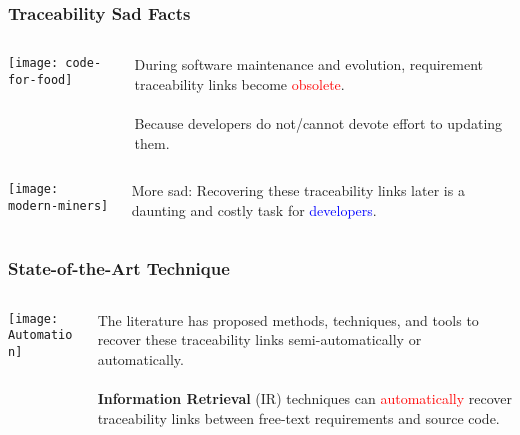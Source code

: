 \documentclass[12pt,hyperref=true,mathserif]{beamer}
\begin{document}
\begin{frame}
\frametitle{Traceability Sad Facts}
\begin{columns}
\begin{column}{0.5\textwidth}
\texttt{[image: code-for-food]}
\end{column}
\begin{column}{0.5\textwidth}
During software maintenance and evolution, requirement traceability links become \textcolor{red}{obsolete}.\\
~\\
Because developers do not/cannot devote effort to updating them.
\end{column}
\end{columns}
\end{frame}

\begin{frame}
\begin{columns}
\begin{column}{0.5\textwidth}
\texttt{[image: modern-miners]}
\end{column}
\begin{column}{0.5\textwidth}
More sad: Recovering these traceability links later is a daunting and costly task for \textcolor{blue}{developers}.
\end{column}
\end{columns}
\end{frame}

\begin{frame}
\frametitle{State-of-the-Art Technique}
\begin{columns}
\begin{column}{0.5\textwidth}
\texttt{[image: Automation]}
\end{column}
\begin{column}{0.5\textwidth}
The literature has proposed methods, techniques, and tools to recover these traceability links semi-automatically or automatically.\\
~\\
\textbf{Information Retrieval} (IR) techniques can \textcolor{red}{automatically} recover traceability links between free-text requirements and source code.
\end{column}
\end{columns}
\end{frame}
\end{document}

